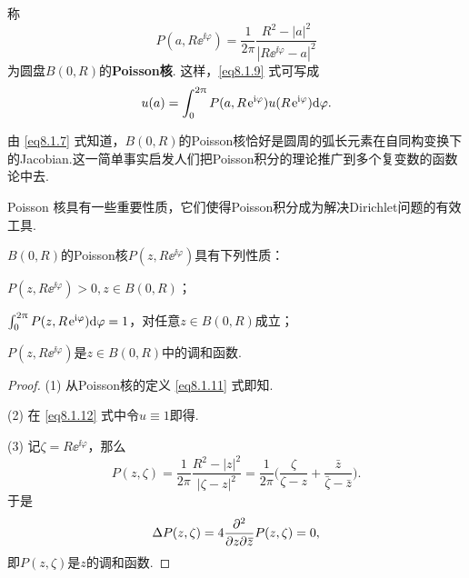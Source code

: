 称
\begin{equation}\label{eq8.1.11}
P(a,R\ee^{\ii\varphi})=\frac1{2\pi}\frac{R^2-|a|^2}{|R\ee^{\ii\varphi}-a|^2}
\end{equation}
为圆盘$B(0,R)$的\textbf{Poisson核}. 这样，\eqref{eq8.1.9} 式可写成
\begin{equation}\label{eq8.1.12}
u(a)=\int_0^{2\uppi}P(a,R\operatorname{\!\!\;\mathrm e}^{\mathrm i\varphi})u(R\operatorname{\!\!\;\mathrm e}^{\mathrm i\varphi})\textrm d\varphi.
\end{equation}

由 \eqref{eq8.1.7} 式知道，$B(0,R)$的Poisson核恰好是圆周的弧长元素在自同构变换下的Jacobian.这一简单事实启发人们把Poisson积分的理论推广到多个复变数的函数论中去.

Poisson 核具有一些重要性质，它们使得Poisson积分成为解决Dirichlet问题的有效工具.

\begin{prop}\label{prop8.1.6}
$B(0,R)$的Poisson核$P(z,R\ee^{\ii\varphi})$具有下列性质：
\begin{eenum}
\item \label{prop8.1.6.1} $P(z,R\ee^{\ii\varphi})>0,z\in B(0,R)$；
\item \label{prop8.1.6.2} $\int_0^{2\uppi}P(z,R\operatorname{\!\!\;\mathrm e}^{\mathrm i\varphi})\textrm d\varphi=1$，对任意$z\in B(0,R)$成立；
\item \label{prop8.1.6.3} $P(z,R\ee^{\ii\varphi})$是$z\in B(0,R)$中的调和函数.
\end{eenum}
\end{prop}
\begin{proof}(1) 从Poisson核的定义 \eqref{eq8.1.11} 式即知.

(2) 在 \eqref{eq8.1.12} 式中令$u\equiv1$即得.

(3) 记$\zeta=R\ee^{\ii\varphi}$，那么
\[P(z,\zeta)=\frac1{2\pi}\frac{R^2-|z|^2}{|\zeta-z|^2}=\frac1{2\pi}
\bigg(\frac\zeta{\zeta-z}+\frac{\bar z}{\bar \zeta-\bar z}\bigg).\]
于是
\[\Delta P(z,\zeta)=4\frac{\partial^2 }{\partial z\partial {}\mkern2mu\overline{\mkern-2muz}}P(z,\zeta)=0,\]
即$P(z,\zeta)$是$z$的调和函数.
\end{proof}

